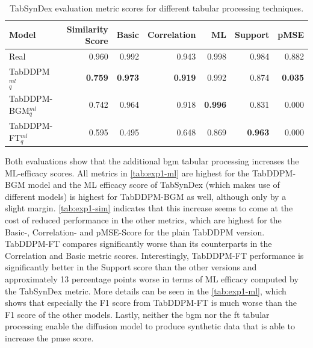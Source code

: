 \begin{table}[h]
	\centering
	\begin{tabular}{lrrrrrr}
		\toprule
		\textbf{Model}         & \textbf{Similarity Score} & \textbf{Basic} & \textbf{Correlation} & \textbf{ML}    & \textbf{Support} & \textbf{pMSE}  \\
		\midrule
		Real                   & 0.960                     & 0.992          & 0.943                & 0.998          & 0.984            & 0.882          \\
		TabDDPM$^{ml}_{q}$     & \textbf{0.759}            & \textbf{0.973} & \textbf{0.919}       & 0.992          & 0.874            & \textbf{0.035} \\
		TabDDPM-BGM$^{ml}_{q}$ & 0.742                     & 0.964          & 0.918                & \textbf{0.996} & 0.831            & 0.000          \\
		TabDDPM-FT$^{ml}_{q}$  & 0.595                     & 0.495          & 0.648                & 0.869          & \textbf{0.963}   & 0.000          \\
		\bottomrule
	\end{tabular}
	\caption[Experiment1-Similarity]{TabSynDex evaluation metric scores for different tabular processing techniques.}
	\label{tab:exp1-sim}
\end{table}

Both evaluations show that the additional \gls{bgm} tabular processing increases the ML-efficacy scores.
All metrics in \autoref{tab:exp1-ml} are highest for the TabDDPM-BGM model and the ML efficacy score of TabSynDex (which makes use of different models)
is highest for TabDDPM-BGM as well, although only by a slight margin.
\autoref{tab:exp1-sim} indicates that this increase seems to come at the cost of reduced performance in the other metrics, which are highest for the Basic-, Correlation- and pMSE-Score for the plain TabDDPM version.
TabDDPM-FT compares significantly worse than its counterparts in the Correlation and Basic metric scores.
Interestingly, TabDDPM-FT performance is significantly better in the Support score than the other versions and approximately 13 percentage points worse in terms of ML efficacy computed by the TabSynDex metric.
More details can be seen in the \autoref{tab:exp1-ml}, which shows that especially the F1 score from TabDDPM-FT is much worse than the F1 score of the other models.
Lastly, neither the \gls{bgm} nor the \gls{ft} tabular processing enable the diffusion model to produce synthetic data that is able to increase the \gls{pmse} score.


